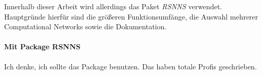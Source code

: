 Innerhalb dieser Arbeit wird allerdings das Paket \textit{RSNNS} verwendet. Hauptgründe hierfür sind die größeren Funktionsumfänge, die Auswahl mehrerer Computational Networks sowie die Dokumentation.
\paragraph{Mit Package RSNNS}
Ich denke, ich sollte das Package benutzen. Das haben totale Profis geschrieben. 